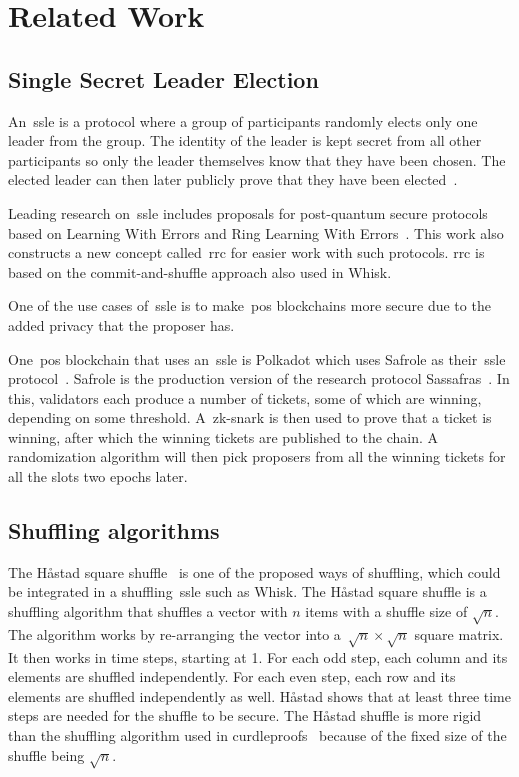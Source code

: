 \section{Related Work}\label{sec:related-work}




\subsection{Single Secret Leader Election}\label{sec:related-work-SSLE}
An~\gls{ssle} is a protocol where a group of participants randomly elects only one leader from the group.
The identity of the leader is kept secret from all other participants so only the leader themselves know that they have been chosen.
The elected leader can then later publicly prove that they have been elected~\cite{10.1145/3419614.3423258}.

Leading research on~\gls{ssle} includes proposals for post-quantum secure protocols based on Learning With Errors and Ring Learning With Errors~\cite{cryptoeprint:2023/1241}.
This work also constructs a new concept called~\gls{rrc} for easier work with such protocols.
\gls{rrc} is based on the commit-and-shuffle approach also used in Whisk.

One of the use cases of~\gls{ssle} is to make~\gls{pos} blockchains more secure due to the added privacy that the proposer has.

One~\gls{pos} blockchain that uses an~\gls{ssle} is Polkadot which uses Safrole as their~\gls{ssle} protocol~\cite{safrole}.
Safrole is the production version of the research protocol Sassafras~\cite{sassafras}.
In this, validators each produce a number of tickets, some of which are winning, depending on some threshold.
A~\gls{zk-snark} is then used to prove that a ticket is winning, after which the winning tickets are published to the chain.
A randomization algorithm will then pick proposers from all the winning tickets for all the slots two epochs later.



\subsection{Shuffling algorithms}\label{subsec:related-work-shuffling-algorithm}

The Håstad square shuffle~\cite{haastad2006square} is one of the proposed ways of shuffling, which could be integrated in a shuffling~\gls{ssle} such as Whisk.
The Håstad square shuffle is a shuffling algorithm that shuffles a vector with $n$ items with a shuffle size of $\sqrt {n}$.
The algorithm works by re-arranging the vector into a~$\sqrt{n}\times\sqrt{n}$ square matrix.
It then works in time steps, starting at 1.
For each odd step, each column and its elements are shuffled independently.
For each even step, each row and its elements are shuffled independently as well.
Håstad shows that at least three time steps are needed for the shuffle to be secure.
The Håstad shuffle is more rigid than the shuffling algorithm used in curdleproofs~\cite{cryptoeprint:2022/560} because of the fixed size of the shuffle being $\sqrt{n}$.

